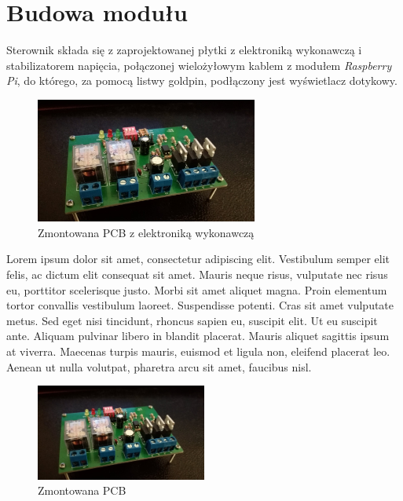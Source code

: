 \documentclass[12pt, eng, twoside, openany, final]{mgr}
\begin{document}
    \section{Budowa modułu}
    Sterownik składa się z zaprojektowanej płytki z elektroniką wykonawczą i stabilizatorem napięcia, połączonej wielożyłowym kablem z modułem \emph{Raspberry Pi}, do którego, za pomocą listwy goldpin, podłączony jest wyświetlacz dotykowy.
        \begin{figure}[H]
        \begin{center}
            \includegraphics[width=0.65\textwidth]{mounted_pcb.jpg}
            \caption{Zmontowana PCB z elektroniką wykonawczą}
        \end{center}
        \end{figure}
        Lorem ipsum dolor sit amet, consectetur adipiscing elit. Vestibulum semper elit felis, ac dictum elit consequat sit amet. Mauris neque risus, vulputate nec risus eu, porttitor scelerisque justo. Morbi sit amet aliquet magna. Proin elementum tortor convallis vestibulum laoreet. Suspendisse potenti. Cras sit amet vulputate metus. Sed eget nisi tincidunt, rhoncus sapien eu, suscipit elit. Ut eu suscipit ante. Aliquam pulvinar libero in blandit placerat. Mauris aliquet sagittis ipsum at viverra. Maecenas turpis mauris, euismod et ligula non, eleifend placerat leo. Aenean ut nulla volutpat, pharetra arcu sit amet, faucibus nisl.
        \begin{figure}[H]
        \begin{center}
            \includegraphics[width=0.5\textwidth]{mounted_pcb.jpg}
            \caption{Zmontowana PCB}
        \end{center}
        \end{figure}
        \newpage
\end{document}
